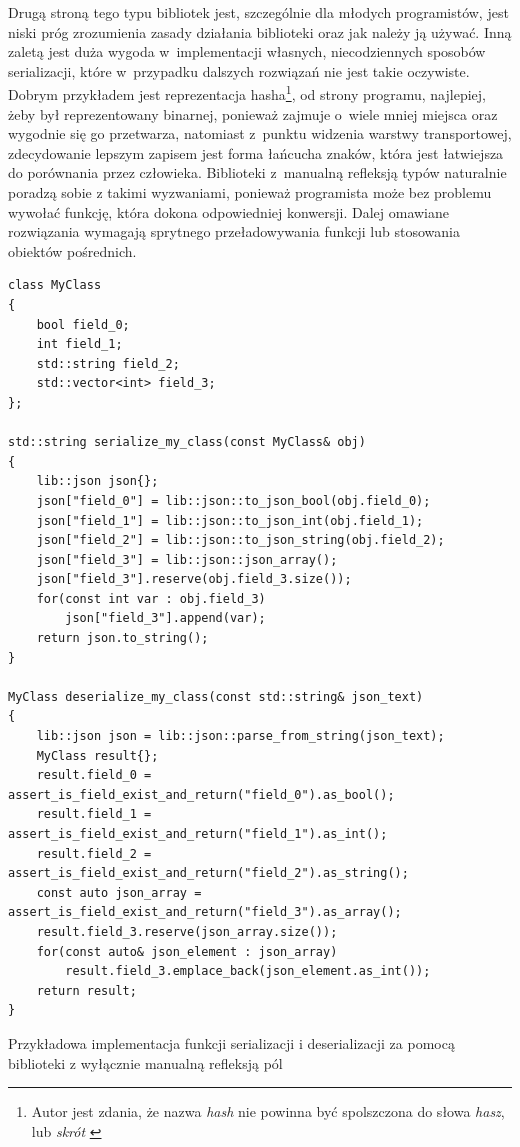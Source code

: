 \documentclass[12pt]{article}
\newcommand{\nonpl}[1]{{\it #1}}
\begin{document}
{{{				Drugą stroną tego typu bibliotek jest, szczególnie dla młodych programistów, jest niski próg zrozumienia zasady działania
				biblioteki oraz jak należy ją używać. Inną zaletą jest duża wygoda w~implementacji własnych, niecodziennych sposobów serializacji,
				które w~przypadku dalszych rozwiązań nie jest takie oczywiste. Dobrym przykładem jest reprezentacja hasha\footnote{
					Autor jest zdania, że nazwa \nonpl{hash} nie powinna być spolszczona do słowa \nonpl{hasz}, lub \nonpl{skrót} \cite{hash_po_angielskiemu}
				}, od strony programu, najlepiej, żeby był reprezentowany binarnej, ponieważ zajmuje o~wiele mniej miejsca oraz wygodnie się go przetwarza,
				natomiast z~punktu widzenia warstwy transportowej, zdecydowanie lepszym zapisem jest forma łańcucha znaków, która jest łatwiejsza do porównania
				przez człowieka. Biblioteki z~manualną refleksją typów naturalnie poradzą sobie z takimi wyzwaniami, ponieważ programista może bez problemu
				wywołać funkcję, która dokona odpowiedniej konwersji. Dalej omawiane rozwiązania wymagają sprytnego przeładowywania funkcji lub
				stosowania obiektów pośrednich.

				\begin{captioned}[H]
					\begin{lstlisting}[frame=single]
class MyClass
{
	bool field_0;
	int field_1;
	std::string field_2;
	std::vector<int> field_3;
};

std::string serialize_my_class(const MyClass& obj)
{
	lib::json json{};
	json["field_0"] = lib::json::to_json_bool(obj.field_0);
	json["field_1"] = lib::json::to_json_int(obj.field_1);
	json["field_2"] = lib::json::to_json_string(obj.field_2);
	json["field_3"] = lib::json::json_array();
	json["field_3"].reserve(obj.field_3.size());
	for(const int var : obj.field_3)
		json["field_3"].append(var);
	return json.to_string();
}

MyClass deserialize_my_class(const std::string& json_text)
{
	lib::json json = lib::json::parse_from_string(json_text);
	MyClass result{};
	result.field_0 = assert_is_field_exist_and_return("field_0").as_bool();
	result.field_1 = assert_is_field_exist_and_return("field_1").as_int();
	result.field_2 = assert_is_field_exist_and_return("field_2").as_string();
	const auto json_array = assert_is_field_exist_and_return("field_3").as_array();
	result.field_3.reserve(json_array.size());
	for(const auto& json_element : json_array)
		result.field_3.emplace_back(json_element.as_int());
	return result;
}
					\end{lstlisting}
					\caption{ Przykładowa implementacja funkcji serializacji i deserializacji za pomocą biblioteki z wyłącznie manualną refleksją pól}
					\label{manual_reflection_example}
				\end{captioned}
			}
		}

}
\end{document}
